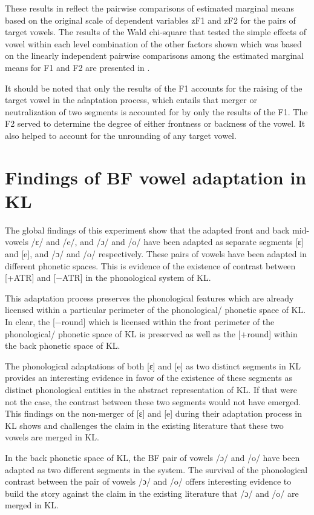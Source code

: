 \documentclass[output=paper]{langscibook}
\begin{document}
These results in  reflect the pairwise comparisons of estimated marginal means based on the original scale of dependent variables zF1 and zF2 for the pairs of target vowels. The results of the Wald chi-square that tested the simple effects of vowel within each level combination of the other factors shown which was based on the linearly independent pairwise comparisons among the estimated marginal means for F1 and F2 are presented in .

It should be noted that only the results of the F1 accounts for the raising of the target vowel in the adaptation process, which entails that merger or neutralization of two segments is accounted for by only the results of the F1. The F2 served to determine the degree of either frontness or backness of the vowel. It also helped to account for the unrounding of any target vowel.

\section{Findings of BF vowel adaptation in KL}
The global findings of this experiment show that the adapted front and back mid-vowels /ɛ/ and /e/, and /ɔ/ and /o/ have been adapted as separate segments [ɛ] and [e], and /ɔ/ and /o/ respectively. These pairs of vowels have been adapted in different phonetic spaces. This is evidence of the existence of contrast between [+ATR] and [−ATR] in the phonological system of KL.

This adaptation process preserves the phonological features which are already licensed within a particular perimeter of the phonological/ phonetic space of KL. In clear, the [−round] which is licensed within the front perimeter of the phonological/ phonetic space of KL is preserved as well as the [+round] within the back phonetic space of KL.

The phonological adaptations of both [ɛ] and [e] as two distinct segments in KL provides an interesting evidence in favor of the existence of these segments as distinct phonological entities in the abstract representation of KL. If that were not the case, the contrast between these two segments would not have emerged. This findings on the non-merger of [ɛ] and [e] during their adaptation process in KL shows and challenges the claim in the existing literature that these two vowels are merged in KL.

In the back phonetic space of KL, the BF pair of vowels /ɔ/ and /o/ have been adapted as two different segments in the system. The survival of the phonological contrast between the  pair of vowels /ɔ/ and /o/ offers interesting evidence to build the story against the claim in the existing literature that /ɔ/ and /o/ are merged in KL.
\end{document}
